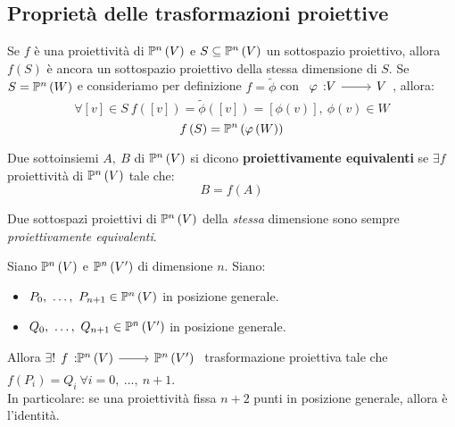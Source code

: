 \subsection{Proprietà delle trasformazioni proiettive}
\begin{observe}
	Se $f$ è una proiettività di $\proj{V}$ e $S\subseteq \proj{V}$ un sottospazio proiettivo, allora $f\left(S\right)$ è ancora un sottospazio proiettivo della stessa dimensione di $S$. Se $S=\proj{W}$ e consideriamo per definizione $f=\tilde{\phi}$ con $\funz{\phi}{V}{V}$, allora:
	\begin{equation*}
		\forall \left[v\right]\in S\ f\left(\left[v\right]\right)=\tilde{\phi}\left(\left[v\right]\right)=\left[\phi\left(v\right)\right],\ \phi\left(v\right)\in W
	\end{equation*}
	\begin{equation}
		f\left(S\right)=\proj{\phi\left(W\right)}
	\end{equation}
\vspace{-6mm}
\end{observe}
\begin{define}
	Due sottoinsiemi $A,\ B$ di $\proj{V}$ si dicono \textbf{proiettivamente equivalenti} se $\exists f$ proiettività di $\proj{V}$ tale che:
	\begin{equation}
		B=f\left(A\right)
	\end{equation}
\vspace{-6mm}
\end{define}
\begin{example}
	Due sottospazi proiettivi di $\proj{V}$ della \textit{stessa} dimensione sono sempre \textit{proiettivamente equivalenti}.
\end{example}
\begin{theorema}
	Siano $\proj{V}$ e $\proj{V'}$ di dimensione $n$. Siano:
	\begin{itemize}
		\item $P_0,\ \ldots,\ P_{n+1}\in\proj{V}$ in posizione generale.
		\item $Q_0,\ \ldots,\ Q_{n+1}\in\proj{V'}$ in posizione generale.
	\end{itemize}
Allora $\exists!\funz{f}{\proj{V}}{\proj{V'}}$ trasformazione proiettiva tale che $f\left(P_i\right)=Q_i\ \forall i=0,\ \ldots,\ n+1$.\\
In particolare: se una proiettività fissa $n+2$ punti in posizione generale, allora è l'identità.
\end{theorema}
